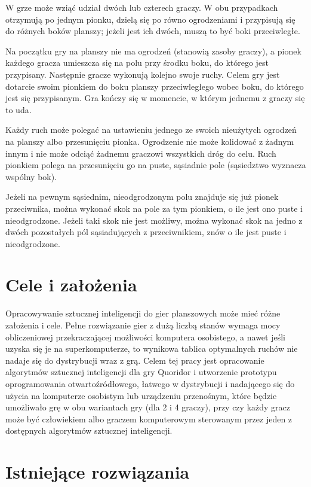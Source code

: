 \documentclass{pracamgr}
\begin{document}
W grze może wziąć udział dwóch lub czterech graczy. W obu przypadkach otrzymują po jednym pionku, dzielą się po równo ogrodzeniami i przypisują się do różnych boków planszy; jeżeli jest ich dwóch, muszą to być boki przeciwległe.

Na początku gry na planszy nie ma ogrodzeń (stanowią zasoby graczy), a pionek każdego gracza umieszcza się na polu przy środku boku, do którego jest przypisany.
Następnie gracze wykonują kolejno swoje ruchy. Celem gry jest dotarcie swoim pionkiem do boku planszy przeciwległego wobec boku, do którego jest się przypisanym. Gra kończy się w momencie, w którym jednemu z graczy się to uda.

Każdy ruch może polegać na ustawieniu jednego ze swoich nieużytych ogrodzeń na planszy albo przesunięciu pionka. Ogrodzenie nie może kolidować z żadnym innym i nie może odciąć żadnemu graczowi wszystkich dróg do celu. Ruch pionkiem polega na przesunięciu go na puste, sąsiadnie pole (sąsiedztwo wyznacza wspólny bok).

Jeżeli na pewnym sąsiednim, nieodgrodzonym polu znajduje się już pionek przeciwnika, można wykonać skok na pole za tym pionkiem, o ile jest ono puste i nieodgrodzone. Jeżeli taki skok nie jest możliwy, można wykonać skok na jedno z dwóch pozostałych pól sąsiadujących z przeciwnikiem, znów o ile jest puste i nieodgrodzone.

\section{Cele i założenia}

Opracowywanie sztucznej inteligencji do gier planszowych może mieć różne założenia i cele.
Pełne rozwiązanie gier z dużą liczbą stanów wymaga mocy obliczeniowej przekraczającej możliwości komputera osobistego, a nawet jeśli uzyska się je na superkomputerze, to wynikowa tablica optymalnych ruchów nie nadaje się do dystrybucji wraz z grą.
Celem tej pracy jest opracowanie algorytmów sztucznej inteligencji dla gry Quoridor i utworzenie prototypu oprogramowania otwartoźródłowego, łatwego w dystrybucji i nadającego się do użycia na komputerze osobistym lub urządzeniu przenośnym, które będzie umożliwało grę w obu wariantach gry (dla 2 i 4 graczy), przy czy każdy gracz może być człowiekiem albo graczem komputerowym sterowanym przez jeden z dostępnych algorytmów sztucznej inteligencji.

\section{Istniejące rozwiązania}
\end{document}
